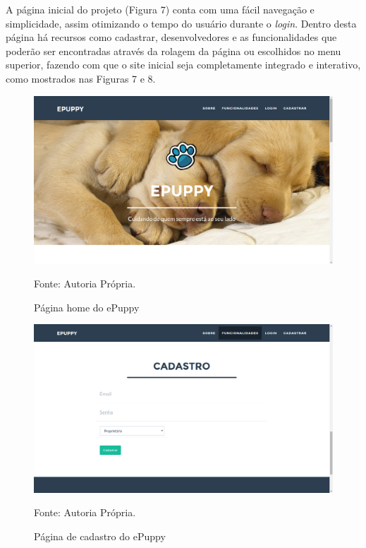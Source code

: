 A página inicial do projeto (Figura 7) conta com uma fácil navegação e simplicidade, assim otimizando o tempo do usuário durante o {\it login}. Dentro desta página há recursos como cadastrar, desenvolvedores e as funcionalidades que poderão ser encontradas através da rolagem da página ou escolhidos no menu superior, fazendo com que o site inicial seja completamente integrado e interativo, como mostrados nas Figuras 7 e 8.
\begin{figure}[h!]
	\center	\includegraphics[scale=0.25
	]{imagens/principal}
	\caption{Página home do ePuppy}
	Fonte: Autoria Própria.
	\label{Rotulo}
\end{figure}
\begin{figure}[h!]
	\center	\includegraphics[scale=0.25
	]{imagens/cadastro}
	\caption{Página de cadastro do ePuppy}
	Fonte: Autoria Própria.
	\label{Rotulo}
\end{figure}

\newpage

